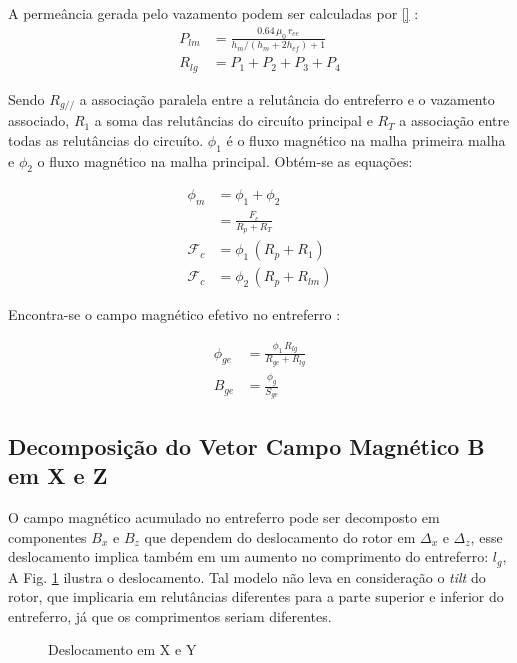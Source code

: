 A permeância gerada pelo vazamento podem ser calculadas por \ref{}  : 
\begin{align}
P_{lm} &= \frac{0.64 \,  \mu_0 \,r_{ee}}{h_m/(h_m+2h_{ef})+1} \\
R_{lg} &= P_1 + P_2 + P_3 + P_4	
\end{align} 

Sendo $R_{g//}$ a associação paralela entre a relutância do entreferro e o vazamento associado, $R_1$ a soma das relutâncias do circuíto principal e $R_T$ a associação entre todas as relutâncias do circuíto. $\phi_1$ é o fluxo magnético na malha primeira malha e $\phi_2$ o fluxo magnético na malha principal. Obtém-se as equações:

\begin{align}
\phi_m &= \phi_1 + \phi_2 \\
&= \frac{F_c}{R_p + R_T} \\
\mathcal{F}_c	 &= \phi_1 \, (R_p + R_1) \\
\mathcal{F}_c    &= \phi_2 \, (R_p + R_{lm})
\end{align}

Encontra-se o campo magnético efetivo no entreferro :

\begin{align}
\phi_{ge} &= \frac{\phi_1 \, R_{lg}}{R_{ge}+R_{lg}} \\
B_{ge} &= \frac{\phi_g}{S_{ge}}
\end{align}


\subsection{Decomposição do Vetor Campo Magnético B em X e Z} \label{SubSec:CampoX/Y}

O campo magnético acumulado no entreferro pode ser decomposto em componentes $B_x$ e $B_z$ que dependem do deslocamento do rotor em $\Delta_x$ e $\Delta_z$, esse deslocamento implica também em um aumento no comprimento do entreferro: $l_g$, A Fig. \ref{Fig:modelo:passivo:DxDz} ilustra o deslocamento. Tal modelo não leva en consideração o \textit{tilt} do rotor, que implicaria em relutâncias diferentes para a parte superior e inferior do entreferro, já que os comprimentos seriam diferentes. 

\begin{figure}[!ht]
	\centering
	\def\svgwidth{0.6\columnwidth}
	
	\caption{Deslocamento em X e Y}
	\label{Fig:modelo:passivo:DxDz}
\end{figure}


